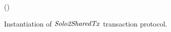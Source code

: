 \begin{figure}
\begin{center}
{\begin{varwidth}{\textwidth}
{            \varSigFin \opFunResult \procFinSig{\varSigAlice}{\varSigBob} \< \< \\
            \varExcess \opAssign {} \opAddPoint {} \< \< \\
            \scriptstyle \pcreturn \varTx \opAssign \varTx \opUnion (\varExcess \opSeperate \varSigFin \opSeperate \varProof)
            }
        \end{varwidth}
        }
    \end{center}
    \caption{Instantiation of $\mathit{Solo2SharedTx}$ transaction protocol. \label{fig:So2MuTx}}
\end{figure}

\begin{figure}
    \begin{center}
\end{center}
\end{figure}
